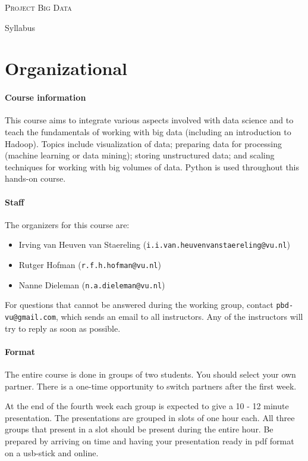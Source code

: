 \documentclass[a4paper]{report}
\newcommand{\blankline}{\par\vspace{5mm}}
\begin{document}
	
\begin{center}
	\textsc{\Large Project Big Data}
	\blankline
	{\large Syllabus}
\end{center}

\noindent\hrulefill

\section*{Organizational}

\paragraph{Course information}
This course aims to integrate various aspects involved with data science and to teach the fundamentals of working with big data (including an
introduction to Hadoop). Topics include visualization of data; preparing data for processing (machine learning or data mining); storing unstructured data; and scaling techniques for working with big volumes of data. Python is used throughout this hands-on course.

\paragraph{Staff}
The organizers for this course are:
\begin{itemize}
	\setlength\itemsep{0mm}
	\item Irving van Heuven van Staereling (\texttt{i.i.van.heuvenvanstaereling@vu.nl})
	\item Rutger Hofman (\texttt{r.f.h.hofman@vu.nl})
	\item Nanne Dieleman (\texttt{n.a.dieleman@vu.nl})
\end{itemize}
For questions that cannot be answered during the working group, contact \texttt{pbd-vu@gmail.com}, which sends an email to all instructors. Any of the instructors will try to reply as soon as possible.

\paragraph{Format}
The entire course is done in groups of two students. You should select your own partner. There is a one-time opportunity to switch partners after the first week.

At the end of the fourth week each group is expected to give a 10 - 12 minute presentation. The presentations are grouped in slots of one hour each. All three groups that present in a slot should be present during the entire hour. Be prepared by arriving on time and having your presentation ready in pdf format on a usb-stick and online.
\end{document}
